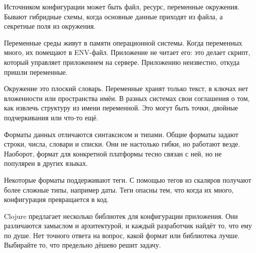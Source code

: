 Источником конфигурации может быть файл, ресурс, переменные окружения. Бывают
гибридные схемы, когда основные данные приходят из файла, а секретные поля из
окружения.

Переменные среды живут в памяти операционной системы. Когда переменных много, их
помещают в ENV-файл. Приложение не читает его: это делает скрипт, который
управляет приложением на сервере. Приложению неизвестно, откуда пришли
переменные.

Окружение это плоский словарь. Переменные хранят только текст, в ключах нет
вложенности или пространства имён. В разных системах свои соглашения о том, как
извлечь структуру из имени переменной. Это могут быть точки, двойные
подчеркивания или что-то ещё.

Форматы данных отличаются синтаксисом и типами. Общие форматы задают строки,
числа, словари и списки. Они не настолько гибки, но работают везде. Наоборот,
формат для конкретной платформы тесно связан с ней, но не популярен в других
языках.

Некоторые форматы поддерживают теги. С помощью тегов из скаляров получают более
сложные типы, например даты. Теги опасны тем, что когда их много, конфигурация
превращается в код.

Clojure предлагает несколько библиотек для конфигурации приложения. Они
различаются замыслом и архитектурой, и каждый разработчик найдёт то, что ему по
душе. Нет точного ответа на вопрос, какой формат или библиотека лучше. Выбирайте
то, что предельно дёшево решит задачу.
